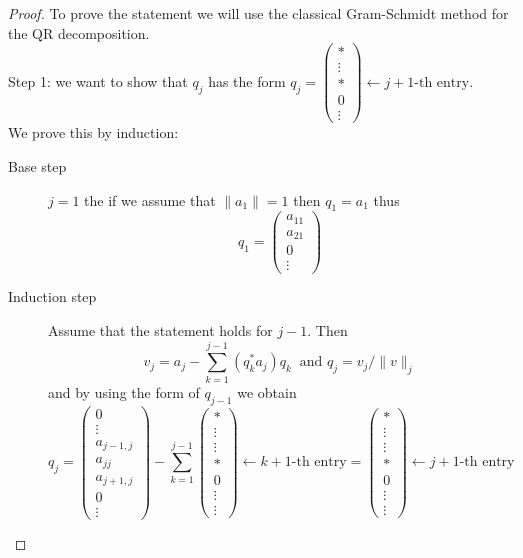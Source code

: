 \documentclass{article}
\numberwithin{pic}{section}
\numberwithin{lem}{section}
\numberwithin{thm}{section}
\numberwithin{cor}{section}
\theoremstyle{definition}
\numberwithin{ex}{section}
\numberwithin{defn}{section}
\theoremstyle{definition}
\theoremstyle{remark}
\begin{document}
\begin{proof}
To prove the statement we will use the classical Gram-Schmidt method for the QR decomposition.\\
Step 1: we want to show that $q_j$ has the form $q_j=\begin{pmatrix}
* \\ 
\vdots \\ 
* \\ 
0 \\ 
\vdots
\end{pmatrix} \leftarrow j+1\text{-th entry}$.\\
We prove this by induction:
\begin{description}
\item[Base step] $j=1$ the if we assume that $\|a_1\|=1$ then $q_1=a_1$ thus
\[q_1= \begin{pmatrix}
a_{11} \\ 
a_{21} \\ 
0 \\  
\vdots
\end{pmatrix}\]
\item[Induction step] Assume that the statement holds for $j-1$. Then
\[v_j=a_j-\sum_{k=1}^{j-1} (q_k^* a_j)q_k~\text{ and } q_j= v_j/\|v\|_j\]
and by using the form of $q_{j-1}$ we obtain
\[q_j= \begin{pmatrix}
0\\ 
\vdots \\ 
a_{j-1, j} \\ 
a_{jj} \\ 
a_{j+1,j} \\
0\\
\vdots
\end{pmatrix}-\sum_{k=1}^{j-1} \begin{pmatrix}
*\\ 
\vdots \\ 
\vdots \\ 
* \\ 
0 \\
\vdots\\
\vdots
\end{pmatrix}\leftarrow k+1\text{-th entry}= \begin{pmatrix}
*\\ 
\vdots \\ 
\vdots \\ 
* \\ 
0 \\
\vdots\\
\vdots
\end{pmatrix}\leftarrow j+1\text{-th entry} \]

\end{description}
\end{proof}
\end{document}
